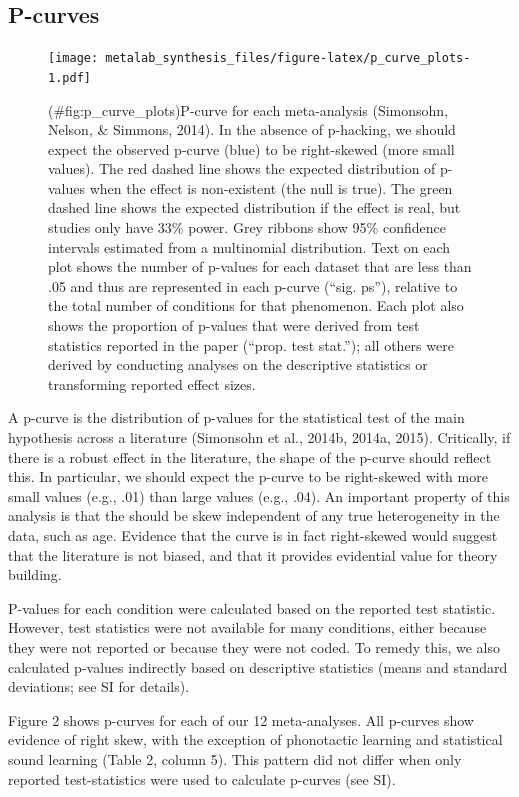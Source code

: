\documentclass[english,floatsintext,man]{apa6}
\theoremstyle{definition}
\theoremstyle{definition}
\theoremstyle{remark}
\begin{document}
\subsection{P-curves}\label{p-curves}

\begin{figure}
\centering
\texttt{[image: metalab\_synthesis\_files/figure-latex/p\_curve\_plots-1.pdf]}
\caption{(\#fig:p\_curve\_plots)P-curve for each meta-analysis
(Simonsohn, Nelson, \& Simmons, 2014). In the absence of p-hacking, we
should expect the observed p-curve (blue) to be right-skewed (more small
values). The red dashed line shows the expected distribution of p-values
when the effect is non-existent (the null is true). The green dashed
line shows the expected distribution if the effect is real, but studies
only have 33\% power. Grey ribbons show 95\% confidence intervals
estimated from a multinomial distribution. Text on each plot shows the
number of p-values for each dataset that are less than .05 and thus are
represented in each p-curve (\enquote{sig. ps}), relative to the total
number of conditions for that phenomenon. Each plot also shows the
proportion of p-values that were derived from test statistics reported
in the paper (\enquote{prop. test stat.}); all others were derived by
conducting analyses on the descriptive statistics or transforming
reported effect sizes.}
\end{figure}

A p-curve is the distribution of p-values for the statistical test of
the main hypothesis across a literature (Simonsohn et al., 2014b, 2014a,
2015). Critically, if there is a robust effect in the literature, the
shape of the p-curve should reflect this. In particular, we should
expect the p-curve to be right-skewed with more small values (e.g., .01)
than large values (e.g., .04). An important property of this analysis is
that the should be skew independent of any true heterogeneity in the
data, such as age. Evidence that the curve is in fact right-skewed would
suggest that the literature is not biased, and that it provides
evidential value for theory building.

P-values for each condition were calculated based on the reported test
statistic. However, test statistics were not available for many
conditions, either because they were not reported or because they were
not coded. To remedy this, we also calculated p-values indirectly based
on descriptive statistics (means and standard deviations; see SI for
details).

Figure 2 shows p-curves for each of our 12 meta-analyses. All p-curves
show evidence of right skew, with the exception of phonotactic learning
and statistical sound learning (Table 2, column 5). This pattern did not
differ when only reported test-statistics were used to calculate
p-curves (see SI).
\end{document}
